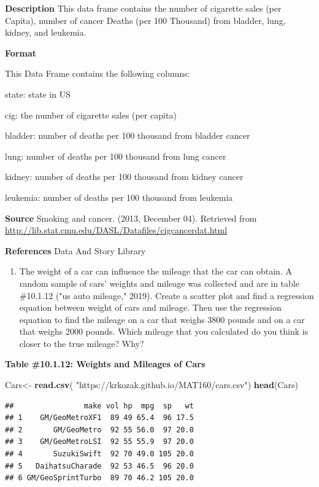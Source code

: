 \documentclass[
]{book}
\newenvironment{Shaded}{\begin{snugshade}}{\end{snugshade}}
\newcommand{\KeywordTok}[1]{\textcolor[rgb]{0.13,0.29,0.53}{\textbf{#1}}}
\newcommand{\NormalTok}[1]{#1}
\newcommand{\StringTok}[1]{\textcolor[rgb]{0.31,0.60,0.02}{#1}}
\providecommand{\tightlist}{%
  \setlength{\itemsep}{0pt}\setlength{\parskip}{0pt}}
\begin{document}
\textbf{Description}
This data frame contains the number of cigarette sales (per Capita), number of cancer Deaths (per 100 Thousand) from bladder, lung, kidney, and leukemia.

\textbf{Format}

This Data Frame contains the following columns:

state: state in US

cig: the number of cigarette sales (per capita)

bladder: number of deaths per 100 thousand from bladder cancer

lung: number of deaths per 100 thousand from lung cancer

kidney: number of deaths per 100 thousand from kidney cancer

leukemia: number of deaths per 100 thousand from leukemia

\textbf{Source}
Smoking and cancer. (2013, December 04). Retrieved from
\url{http://lib.stat.cmu.edu/DASL/Datafiles/cigcancerdat.html}

\textbf{References}
Data And Story Library

\begin{enumerate}
\def\labelenumi{\arabic{enumi}.}
\setcounter{enumi}{9}
\tightlist
\item
  The weight of a car can influence the mileage that the car can obtain. A random sample of cars' weights and mileage was collected and are in table \#10.1.12 ("us auto mileage," 2019). Create a scatter plot and find a regression equation between weight of cars and mileage. Then use the regression equation to find the mileage on a car that weighs 3800 pounds and on a car that weighs 2000 pounds. Which mileage that you calculated do you think is closer to the true mileage? Why?
\end{enumerate}

\textbf{Table \#10.1.12: Weights and Mileages of Cars}

\begin{Shaded}
\begin{Highlighting}[]
\NormalTok{Cars<-}\StringTok{ }\KeywordTok{read.csv}\NormalTok{(}
  \StringTok{"https://krkozak.github.io/MAT160/cars.csv"}\NormalTok{)}
\KeywordTok{head}\NormalTok{(Cars)}
\end{Highlighting}
\end{Shaded}

\begin{verbatim}
##                make vol hp  mpg  sp   wt
## 1    GM/GeoMetroXF1  89 49 65.4  96 17.5
## 2       GM/GeoMetro  92 55 56.0  97 20.0
## 3    GM/GeoMetroLSI  92 55 55.9  97 20.0
## 4       SuzukiSwift  92 70 49.0 105 20.0
## 5   DaihatsuCharade  92 53 46.5  96 20.0
## 6 GM/GeoSprintTurbo  89 70 46.2 105 20.0
\end{verbatim}
\end{document}
